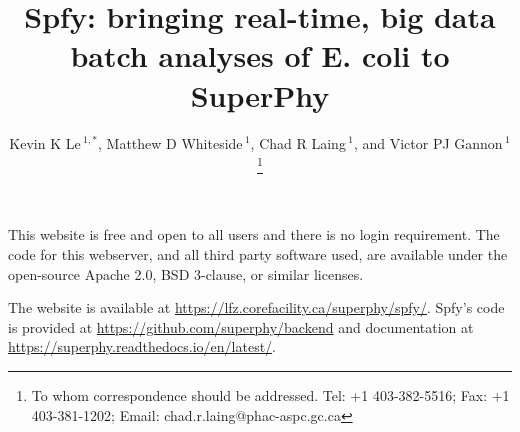 \documentclass[a4,center,fleqn]{NAR}
\begin{document}
\title{Spfy: bringing real-time, big data batch analyses of E. coli to SuperPhy}

\author{%
Kevin K Le\,$^{1,*}$,
Matthew D Whiteside\,$^{1}$,
Chad R Laing\,$^1$,
and Victor PJ Gannon\,$^1$%
\footnote{To whom correspondence should be addressed.
Tel: +1 403-382-5516; Fax: +1 403-381-1202; Email: chad.r.laing@phac-aspc.gc.ca}}

\address{%
$^{1}$Laboratory for Foodborne Zoonoses, Public Health Agency of Canada, Twp Rd 9-1, Lethbridge, AB, T1J 3Z4, Canada}

\maketitle


This website is free and open to all users and there is no login requirement. The code for this webserver, and all third party software used, are available under the open-source Apache 2.0, BSD 3-clause, or similar licenses. \par

The website is available at \url{https://lfz.corefacility.ca/superphy/spfy/}. Spfy's code is provided at \url{https://github.com/superphy/backend} and documentation at \url{https://superphy.readthedocs.io/en/latest/}. \par
\end{document}
